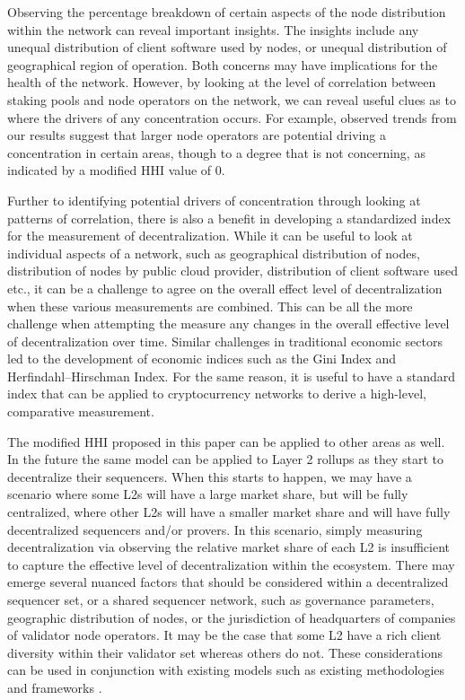 \documentclass[conference]{IEEEtran}
\begin{document}
Observing the percentage breakdown of certain aspects of the node distribution within the network can reveal important insights.  The insights include any unequal distribution of client software used by nodes, or unequal distribution of geographical region of operation.  Both concerns may have implications for the health of the network.  However, by looking at the level of correlation between staking pools and node operators on the network, we can reveal useful clues as to where the drivers of any concentration occurs.  For example, observed trends from our results suggest that larger node operators are potential driving a concentration in certain areas, though to a degree that is not concerning, as indicated by a modified HHI value of 0.

Further to identifying potential drivers of concentration through looking at patterns of correlation, there is also a benefit in developing a standardized index for the measurement of decentralization.  While it can be useful to look at individual aspects of a network, such as geographical distribution of nodes, distribution of nodes by public cloud provider, distribution of client software used etc., it can be a challenge to agree on the overall effect level of decentralization when these various measurements are combined.  This can be all the more challenge when attempting the measure any changes in the overall effective level of decentralization over time.  Similar challenges in traditional economic sectors led to the development of economic indices such as the Gini Index and Herfindahl–Hirschman Index.  For the same reason, it is useful to have a standard index that can be applied to cryptocurrency networks to derive a high-level, comparative measurement.

The modified HHI proposed in this paper can be applied to other areas as well.  In the future the same model can be applied to Layer 2 rollups as they start to decentralize their sequencers.  When this starts to happen, we may have a scenario where some L2s will have a large market share, but will be fully centralized, where other L2s will have a smaller market share and will have fully decentralized sequencers and/or provers.  In this scenario, simply measuring decentralization via observing the relative market share of each L2 is insufficient to capture the effective level of decentralization within the ecosystem.  There may emerge several nuanced factors that should be considered within a decentralized sequencer set, or a shared sequencer network, such as governance parameters, geographic distribution of nodes, or the jurisdiction of headquarters of companies of validator node operators.  It may be the case that some L2 have a rich client diversity within their validator set whereas others do not.  These considerations can be used in conjunction with existing models such as existing methodologies and frameworks \cite{l2beat2024}.
\end{document}
